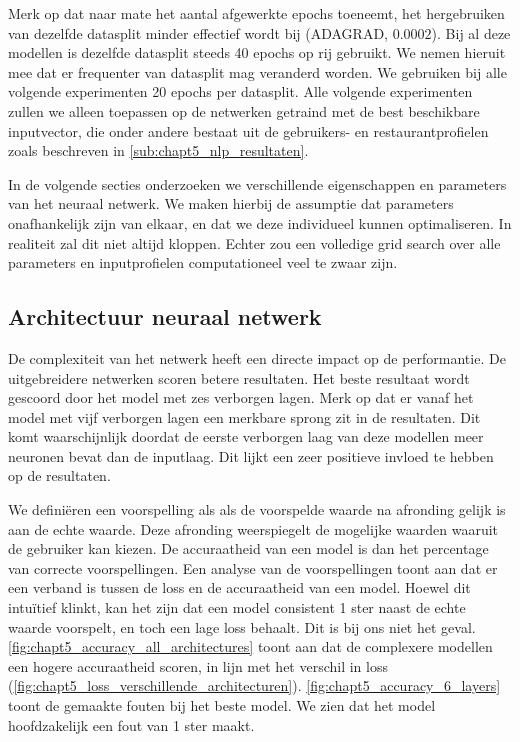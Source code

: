 Merk op dat naar mate het aantal afgewerkte epochs toeneemt, het hergebruiken van dezelfde datasplit minder effectief wordt bij (ADAGRAD, $0.0002$). Bij al deze modellen is dezelfde datasplit steeds 40 epochs op rij gebruikt. We nemen hieruit mee dat er frequenter van datasplit mag veranderd worden. We gebruiken bij alle volgende experimenten 20 epochs per datasplit.\newline
Alle volgende experimenten zullen we alleen toepassen op de netwerken getraind met de best beschikbare inputvector, die onder andere bestaat uit de gebruikers- en restaurantprofielen zoals beschreven in \autoref{sub:chapt5_nlp_resultaten}.

In de volgende secties onderzoeken we verschillende eigenschappen en parameters van het neuraal netwerk. We maken hierbij de assumptie dat parameters onafhankelijk zijn van elkaar, en dat we deze individueel kunnen optimaliseren. In realiteit zal dit niet altijd kloppen. Echter zou een volledige grid search over alle parameters en inputprofielen computationeel veel te zwaar zijn.

\subsection{Architectuur neuraal netwerk}
De complexiteit van het netwerk heeft een directe impact op de performantie. De uitgebreidere netwerken scoren betere resultaten. Het beste resultaat wordt gescoord door het model met zes verborgen lagen. Merk op dat er vanaf het model met vijf verborgen lagen een merkbare sprong zit in de resultaten. Dit komt waarschijnlijk doordat de eerste verborgen laag van deze modellen meer neuronen bevat dan de inputlaag. Dit lijkt een zeer positieve invloed te hebben op de resultaten.


We definiëren een voorspelling als  als de voorspelde waarde na afronding gelijk is aan de echte waarde. Deze afronding weerspiegelt de mogelijke waarden waaruit de gebruiker kan kiezen. De accuraatheid van een model is dan het percentage van correcte voorspellingen. Een analyse van de voorspellingen toont aan dat er een verband is tussen de loss en de accuraatheid van een model. Hoewel dit intuïtief klinkt, kan het zijn dat een model consistent 1 ster naast de echte waarde voorspelt, en toch een lage loss behaalt. Dit is bij ons niet het geval. \autoref{fig:chapt5_accuracy_all_architectures} toont aan dat de complexere modellen een hogere accuraatheid scoren, in lijn met het verschil in loss (\autoref{fig:chapt5_loss_verschillende_architecturen}). \autoref{fig:chapt5_accuracy_6_layers} toont de gemaakte fouten bij het beste model. We zien dat het model hoofdzakelijk een fout van 1 ster maakt.


